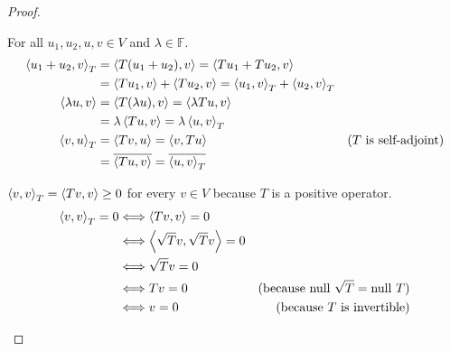 \begin{proof}
\begin{enumerate}[label={(\alph*)}]
              For all $u_{1}, u_{2}, u, v\in V$ and $\lambda\in\mathbb{F}$.
              \begin{align*}
                  \left\langle{u_{1} + u_{2}, v}\right\rangle_{T} & = \left\langle{T(u_{1} + u_{2}), v}\right\rangle = \left\langle{Tu_{1} + Tu_{2}, v}\right\rangle                                                                   \\
                                                   & = \left\langle{Tu_{1}, v}\right\rangle + \left\langle{Tu_{2}, v}\right\rangle = \left\langle{u_{1}, v}\right\rangle_{T} + \left\langle{u_{2}, v}\right\rangle_{T}                                \\
                  \left\langle{\lambda u, v}\right\rangle         & = \left\langle{T(\lambda u), v}\right\rangle = \left\langle{\lambda Tu, v}\right\rangle                                                                            \\
                                                   & = \lambda\left\langle{Tu, v}\right\rangle = \lambda\left\langle{u, v}\right\rangle_{T}                                                                             \\
                  \left\langle{v, u}\right\rangle_{T}             & = \left\langle{Tv, u}\right\rangle = \left\langle{v, Tu}\right\rangle                                                               & \text{($T$ is self-adjoint)} \\
                                                   & = \overline{\left\langle{Tu, v}\right\rangle} = \overline{\left\langle{u, v}\right\rangle_{T}}
              \end{align*}

              $\left\langle{v, v}\right\rangle_{T} = \left\langle{Tv, v}\right\rangle\geq 0$ for every $v\in V$ because $T$ is a positive operator.
              \begin{align*}
                  \left\langle{v, v}\right\rangle_{T} = 0 & \Longleftrightarrow \left\langle{Tv, v}\right\rangle = 0                                                                    \\
                                           & \Longleftrightarrow \left\langle{\sqrt{T}v, \sqrt{T}v}\right\rangle = 0                                                     \\
                                           & \Longleftrightarrow \sqrt{T}v = 0                                                                            \\
                                           & \Longleftrightarrow Tv = 0                               & \text{(because $\operatorname{null}\,{\sqrt{T}} = \operatorname{null}\,{T}$)} \\
                                           & \Longleftrightarrow v = 0                                & \text{(because $T$ is invertible)}
              \end{align*}


\end{enumerate}
\end{proof}
